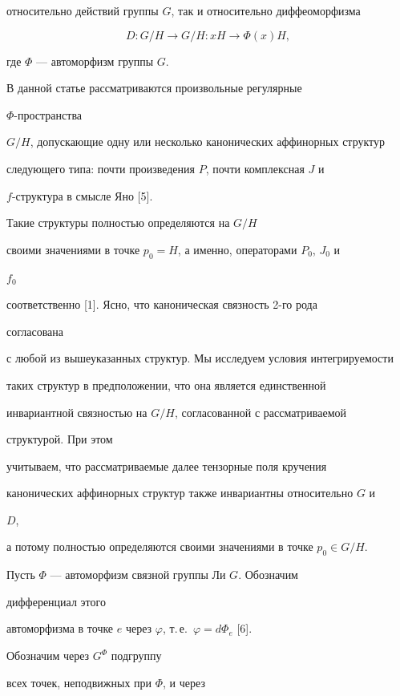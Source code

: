 относительно действий группы $G$, так и относительно диффеоморфизма 


$$ 


D:G/H\to G/H:x H\to\Phi(x)H, 


$$ 


где $\Phi$ --- автоморфизм группы $G$. 


 


В данной статье рассматриваются произвольные регулярные


$\Phi$-пространства 


$G/H$, допускающие одну или несколько канонических аффинорных структур 


следующего типа: почти произведения $P$, почти комплексная $J$ и  


$f$-структура в смысле Яно [5].  


Такие структуры полностью определяются на $G/H$ 


своими значениями в точке $p_0=H$, а именно, операторами $P_0$, $J_0$ и 


$f_0$ 


соответственно [1]. Ясно, что каноническая связность 2-го рода 


согласована 


с любой из вышеуказанных структур. Мы исследуем условия интегрируемости 


таких структур в предположении, что она является единственной 


инвариантной связностью на $G/H$, согласованной с рассматриваемой 


структурой. При этом 


учитываем, что рассматриваемые далее тензорные поля кручения 


канонических аффинорных структур также инвариантны относительно $G$ и 


$D$, 


а потому полностью определяются своими значениями в точке $p_0\in G/H$. 


 


Пусть $\Phi$ --- автоморфизм связной группы Ли $G$. Обозначим 


дифференциал этого 


автоморфизма в точке $e$ через $\varphi$, т.\,е.~$\varphi=d\Phi_e$ [6]. 


Обозначим через $G^\Phi$ подгруппу 


всех точек, неподвижных при $\Phi$, и через 


